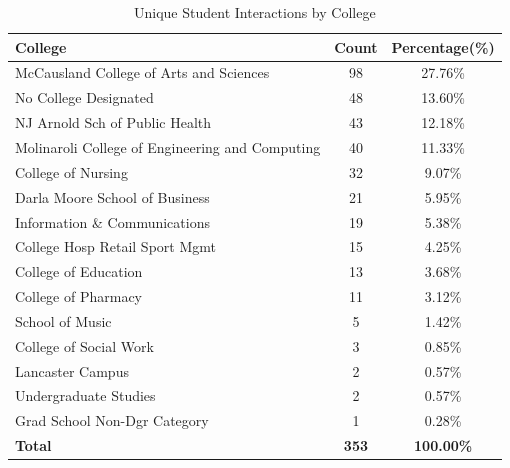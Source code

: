 \documentclass[
  letterpaper,
  DIV=11,
  numbers=noendperiod]{scrartcl}
\begin{document}
\begin{longtable}[t]{lcc}
\caption{\label{tab:CollegeTabCSE}Unique Student Interactions by College}\\
\toprule
\textbf{College} & \textbf{Count} & \textbf{Percentage(\%)}\\
\midrule
McCausland College of Arts and Sciences & 98 & 27.76\%\\
No College Designated & 48 & 13.60\%\\
NJ Arnold Sch of Public Health & 43 & 12.18\%\\
Molinaroli College of Engineering and Computing & 40 & 11.33\%\\
College of Nursing & 32 & 9.07\%\\
\addlinespace
Darla Moore School of Business & 21 & 5.95\%\\
Information \& Communications & 19 & 5.38\%\\
College Hosp Retail Sport Mgmt & 15 & 4.25\%\\
College of Education & 13 & 3.68\%\\
College of Pharmacy & 11 & 3.12\%\\
\addlinespace
School of Music & 5 & 1.42\%\\
College of Social Work & 3 & 0.85\%\\
Lancaster Campus & 2 & 0.57\%\\
Undergraduate Studies & 2 & 0.57\%\\
Grad School Non-Dgr Category & 1 & 0.28\%\\
\midrule
\addlinespace
\textbf{Total} & \textbf{353} & \textbf{100.00\%}\\
\bottomrule
\end{longtable}
\endgroup{}

\clearpage
\FloatBarrier

\begin{table}
\centering
\caption{\label{tab:OvrllClssStndCSE}Unique Student Interactions by Class Standing}
\centering
{}
\end{table}
\end{document}
